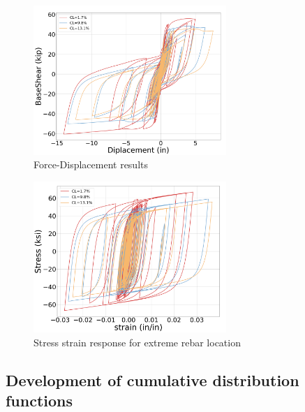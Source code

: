 \begin{figure}[htbp]
	\centering
	\includegraphics[width=0.65\textwidth]{Chapter-5/figs/ForceDisplacement_01}
	\caption{Force-Displacement results}
	\label{fig:Force-Displacement_Results}
\end{figure}
\begin{figure}[htbp]
	\centering
	\includegraphics[width=0.65\textwidth]{Chapter-5/figs/Steel_StressStrain}
	\caption{Stress strain response for extreme rebar location}
	\label{fig:Steel_Stress_Strain_Response}
\end{figure}

\subsection{Development of cumulative distribution functions}

